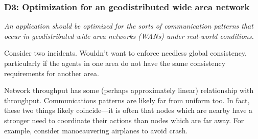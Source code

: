 \subsubsection*{D3: Optimization for an geodistributed wide area network}

\emph{An application should be optimized for the sorts of
communication patterns that occur in geodistributed wide area networks
(WANs) under real-world conditions.}

Consider two incidents. Wouldn't want to enforce needless global
consistency, particularly if the agents in one area do not have the
same consistency requirements for another area.

Network throughput has some (perhaps approximately linear)
relationship with throughput. Communications patterns are likely far
from uniform too. In fact, these two things likely coincide---it is
often that nodes which are nearby have a stronger need to coordinate
their actions than nodes which are far away. For example, consider
manoeauvering airplanes to avoid crash.

